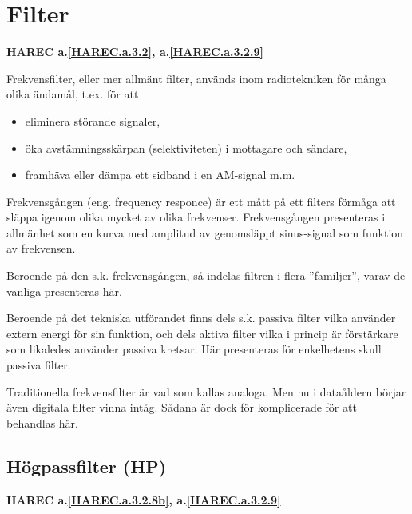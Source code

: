 \section{Filter}
\textbf{HAREC a.\ref{HAREC.a.3.2}\label{myHAREC.a.3.2}, a.\ref{HAREC.a.3.2.9}\label{myHAREC.a.3.2.9}}

Frekvensfilter, eller mer allmänt filter, används inom radiotekniken för många
olika ändamål, t.ex. för att
\begin{itemize}
\item eliminera störande signaler,
\item  öka avstämningsskärpan (selektiviteten) i mottagare och sändare,
\item framhäva eller dämpa ett sidband i en AM-signal m.m.
\end{itemize}

Frekvensgången (eng. frequency responce) är ett mått på ett filters förmåga
att släppa igenom olika mycket av olika frekvenser.
Frekvensgången presenteras i allmänhet som en kurva med amplitud av genomsläppt
sinus-signal som funktion av frekvensen.

Beroende på den s.k. frekvensgången, så indelas filtren i flera ''familjer'',
varav de vanliga presenteras här.

Beroende på det tekniska utförandet finns dels s.k. passiva filter vilka
använder extern energi för sin funktion, och dels aktiva filter vilka i princip
är förstärkare som likaledes använder passiva kretsar. Här presenteras
för enkelhetens skull passiva filter.

Traditionella frekvensfilter är vad som kallas analoga. Men nu i dataåldern
börjar även digitala filter vinna intåg. Sådana är dock för komplicerade för
att behandlas här.

\subsection{Högpassfilter (HP)}
\textbf{HAREC
  a.\ref{HAREC.a.3.2.8b}\label{myHAREC.a.3.2.8b},
  a.\ref{HAREC.a.3.2.9}\label{myHAREC.a.3.2.9a}
}

